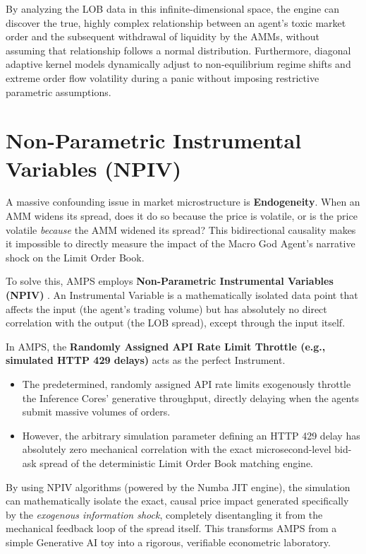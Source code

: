By analyzing the LOB data in this infinite-dimensional space, the engine can discover the true, highly complex relationship between an agent's toxic market order and the subsequent withdrawal of liquidity by the AMMs, without assuming that relationship follows a normal distribution. Furthermore, diagonal adaptive kernel models dynamically adjust to non-equilibrium regime shifts and extreme order flow volatility during a panic without imposing restrictive parametric assumptions.

\section{Non-Parametric Instrumental Variables (NPIV)}

A massive confounding issue in market microstructure is \textbf{Endogeneity}. When an AMM widens its spread, does it do so because the price is volatile, or is the price volatile \textit{because} the AMM widened its spread? This bidirectional causality makes it impossible to directly measure the impact of the Macro God Agent's narrative shock on the Limit Order Book.

To solve this, AMPS employs \textbf{Non-Parametric Instrumental Variables (NPIV)} \cite{mingdu2024npiv}. An Instrumental Variable is a mathematically isolated data point that affects the input (the agent's trading volume) but has absolutely no direct correlation with the output (the LOB spread), except through the input itself. 

In AMPS, the \textbf{Randomly Assigned API Rate Limit Throttle (e.g., simulated HTTP 429 delays)} acts as the perfect Instrument. 
\begin{itemize}
    \item The predetermined, randomly assigned API rate limits exogenously throttle the Inference Cores' generative throughput, directly delaying when the agents submit massive volumes of orders.
    \item However, the arbitrary simulation parameter defining an HTTP 429 delay has absolutely zero mechanical correlation with the exact microsecond-level bid-ask spread of the deterministic Limit Order Book matching engine.
\end{itemize}

By using NPIV algorithms (powered by the Numba JIT engine), the simulation can mathematically isolate the exact, causal price impact generated specifically by the \textit{exogenous information shock}, completely disentangling it from the mechanical feedback loop of the spread itself. This transforms AMPS from a simple Generative AI toy into a rigorous, verifiable econometric laboratory.
